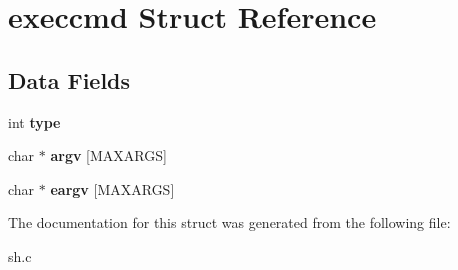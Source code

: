 \hypertarget{structexeccmd}{}\section{execcmd Struct Reference}
\label{structexeccmd}
\subsection*{Data Fields}
\begin{DoxyCompactItemize}
\item 
int {\bfseries type}\hypertarget{structexeccmd_a9db03fe1a8bff63e9205fc98eeb19741}{}\label{structexeccmd_a9db03fe1a8bff63e9205fc98eeb19741}

\item 
char $\ast$ {\bfseries argv} \mbox{[}M\+A\+X\+A\+R\+GS\mbox{]}\hypertarget{structexeccmd_a00e53af4bc0e28bbd6842bdceaee1ea9}{}\label{structexeccmd_a00e53af4bc0e28bbd6842bdceaee1ea9}

\item 
char $\ast$ {\bfseries eargv} \mbox{[}M\+A\+X\+A\+R\+GS\mbox{]}\hypertarget{structexeccmd_ab3444b3d0c478e5338f55b7dffe70521}{}\label{structexeccmd_ab3444b3d0c478e5338f55b7dffe70521}

\end{DoxyCompactItemize}


The documentation for this struct was generated from the following file\+:\begin{DoxyCompactItemize}
\item 
sh.\+c\end{DoxyCompactItemize}
